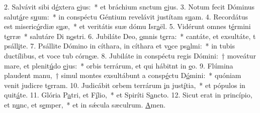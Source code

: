 2. Salvávit sibi d\uline{é}xtera \uline{e}jus:~* et bráchium snctum \uline{e}jus.
3. Notum fecit Dóminus salut\uline{á}re s\uline{u}um:~* in conspéctu Géntium revelávit justítam s\uline{u}am.
4. Recordátus est miseric\uline{ó}rdiæ s\uline{u}æ,~* et veritátis suæ dómu Isr\uline{a}ël.
5. Vidérunt omnes t\uline{é}rmini t\uline{e}rræ~* salutáre Di n\uline{o}stri.
6. Jubiláte Deo, \uline{o}mnis t\uline{e}rra:~* cantáte, et exsultáte, t psáll\uline{i}te.
7. Psállite Dómino in cíthara, in cíthara et v\uline{o}ce ps\uline{a}lmi:~* in tubis ductílibus, et voce tub córn\uline{e}æ.
8. Jubiláte in conspéctu regis Dómini:~† moveátur mare, et plenit\uline{ú}do \uline{e}jus:~* orbis terrárum, et qui hábitnt in \uline{e}o.
9. Flúmina plaudent manu,~† simul montes exsultábunt a consp\uline{é}ctu D\uline{ó}mini:~* quóniam venit judicre t\uline{e}rram.
10. Judicábit orbem terrárum \uline{i}n just\uline{í}tia,~* et pópulos in quit\uline{á}te.
11. Glória P\uline{a}tri, et F\uline{í}lio,~* et Spiríti S\uline{a}ncto.
12. Sicut erat in princípio, et n\uline{u}nc, et s\uline{e}mper,~* et in sǽcula sæculrum. \uline{A}men.
